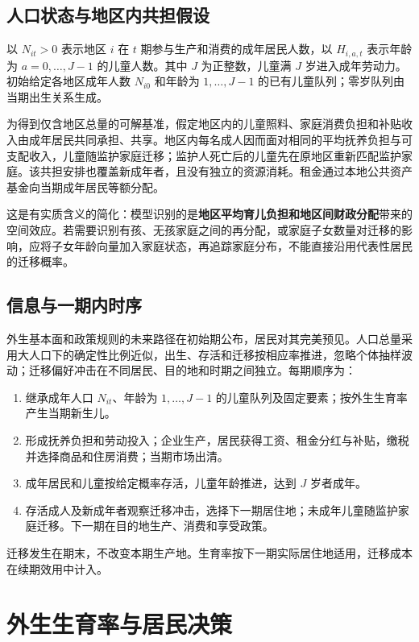 \documentclass[UTF8,a4paper,zihao=-4,fontset=windows]{ctexart}
\numberwithin{equation}{section}
\begin{document}
\subsection{人口状态与地区内共担假设}
以 $N_{it}>0$ 表示地区 $i$ 在 $t$ 期参与生产和消费的成年居民人数，以 $H_{i,a,t}$ 表示年龄为 $a=0,\ldots,J-1$ 的儿童人数。其中 $J$ 为正整数，儿童满 $J$ 岁进入成年劳动力。初始给定各地区成年人数 $N_{i0}$ 和年龄为 $1,\ldots,J-1$ 的已有儿童队列；零岁队列由当期出生关系生成。

为得到仅含地区总量的可解基准，假定地区内的儿童照料、家庭消费负担和补贴收入由成年居民共同承担、共享。地区内每名成人因而面对相同的平均抚养负担与可支配收入，儿童随监护家庭迁移；监护人死亡后的儿童先在原地区重新匹配监护家庭。该共担安排也覆盖新成年者，且没有独立的资源消耗。租金通过本地公共资产基金向当期成年居民等额分配。

这是有实质含义的简化：模型识别的是\textbf{地区平均育儿负担和地区间财政分配}带来的空间效应。若需要识别有孩、无孩家庭之间的再分配，或家庭子女数量对迁移的影响，应将子女年龄向量加入家庭状态，再追踪家庭分布，不能直接沿用代表性居民的迁移概率。

\subsection{信息与一期内时序}
外生基本面和政策规则的未来路径在初始期公布，居民对其完美预见。人口总量采用大人口下的确定性比例近似，出生、存活和迁移按相应率推进，忽略个体抽样波动；迁移偏好冲击在不同居民、目的地和时期之间独立。每期顺序为：
\begin{enumerate}
  \item 继承成年人口 $N_{it}$、年龄为 $1,\ldots,J-1$ 的儿童队列及固定要素；按外生生育率产生当期新生儿。
  \item 形成抚养负担和劳动投入；企业生产，居民获得工资、租金分红与补贴，缴税并选择商品和住房消费；当期市场出清。
  \item 成年居民和儿童按给定概率存活，儿童年龄推进，达到 $J$ 岁者成年。
  \item 存活成人及新成年者观察迁移冲击，选择下一期居住地；未成年儿童随监护家庭迁移。下一期在目的地生产、消费和享受政策。
\end{enumerate}
迁移发生在期末，不改变本期生产地。生育率按下一期实际居住地适用，迁移成本在续期效用中计入。

\section{外生生育率与居民决策}
\label{sec:households}
\end{document}
